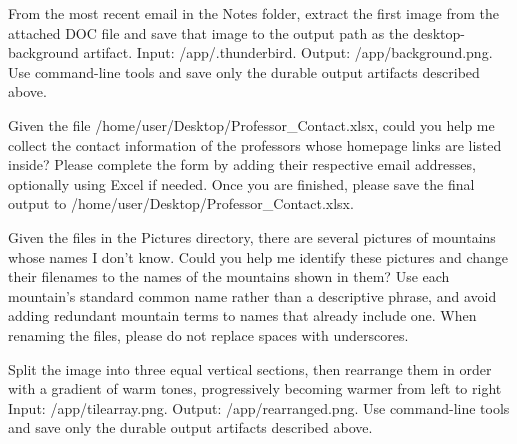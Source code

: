 \begin{instructionbox}
From the most recent email in the \textasciigrave{}Notes\textasciigrave{} folder, extract the first image from the attached DOC file and save that image to the output path as the desktop-background artifact.
Input: \textasciigrave{}/app/.thunderbird\textasciigrave{}.
Output: \textasciigrave{}/app/background.png\textasciigrave{}.
Use command-line tools and save only the durable output artifacts described above.
\end{instructionbox}

\begin{instructionbox}
Given the file \textasciigrave{}/home/user/Desktop/Professor\_Contact.xlsx\textasciigrave{}, could you help me collect the contact information of the professors whose homepage links are listed inside? Please complete the form by adding their respective email addresses, optionally using Excel if needed. Once you are finished, please save the final output to \textasciigrave{}/home/user/Desktop/Professor\_Contact.xlsx\textasciigrave{}.
\end{instructionbox}

\begin{instructionbox}
Given the files in the Pictures directory, there are several pictures of mountains whose names I don't know. Could you help me identify these pictures and change their filenames to the names of the mountains shown in them? Use each mountain's standard common name rather than a descriptive phrase, and avoid adding redundant mountain terms to names that already include one. When renaming the files, please do not replace spaces with underscores.
\end{instructionbox}

\begin{instructionbox}
Split the image into three equal vertical sections, then rearrange them in order with a gradient of warm tones, progressively becoming warmer from left to right
Input: \textasciigrave{}/app/tilearray.png\textasciigrave{}.
Output: \textasciigrave{}/app/rearranged.png\textasciigrave{}.
Use command-line tools and save only the durable output artifacts described above.
\end{instructionbox}

